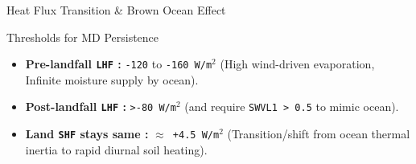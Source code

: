 \documentclass[8pt, aspectratio=169]{beamer}
\begin{document}
\begin{frame}{Heat Flux Transition \& Brown Ocean Effect}
    \begin{block}{Thresholds for MD Persistence}
        \begin{itemize}
            \item \textbf{Pre-landfall \texttt{LHF} :} \texttt{-120} to \texttt{-160 W/m$^2$} (High wind-driven evaporation, Infinite moisture supply by ocean).
            \item \textbf{Post-landfall \texttt{LHF} :} \texttt{>-80 W/m$^2$} (and require \texttt{SWVL1 > 0.5} to mimic ocean).
            \item \textbf{Land \texttt{SHF} stays same :} \texttt{$\approx$ +4.5 W/m$^2$} (Transition/shift from ocean thermal inertia to rapid diurnal soil heating).
        \end{itemize}
    \end{block}
\end{frame}
\end{document}
